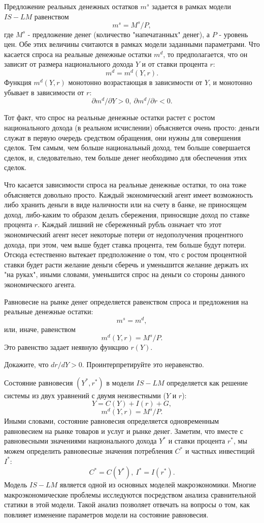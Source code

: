     Предложение реальных денежных остатков $m^{s}$ задается в рамках
    модели $IS-LM$ равенством
    \[m^{s}=M^{s}/P,\]
    где $M^{s}$ - предложение денег (количество "напечатанных" денег), а $P$ -
    уровень цен. Обе этих величины считаются в рамках модели заданными
    параметрами. Что касается спроса на реальные денежные остатки $m^{d}$, то
    предполагается, что он зависит от размера национального дохода $Y$  и
    от ставки процента $r$:
    \[m^{d}=m^{d}(Y,r).\]
    Функция $m^{d}(Y,r)$ монотонно возрастающая в зависимости от $Y$, и
    монотонно убывает в зависимости от $r$:
    \[\partial m^{d}/\partial Y>0, \ \partial m^{d}/\partial r<0.\]

    Тот факт, что спрос на реальные денежные остатки растет с ростом
    национального дохода (в реальном исчислении) объясняется очень
    просто: деньги служат в первую очередь средством обращения, они
    нужны для совершения сделок. Тем самым, чем больше национальный
    доход, тем больше совершается сделок, и, следовательно, тем больше
    денег необходимо для обеспечения этих сделок.

    Что касается зависимости спроса на реальные денежные остатки, то
    она тоже объясняется довольно просто. Каждый экономический агент
    имеет возможность либо хранить деньги в виде наличности или на счету
    в банке, не приносящем доход, либо-каким то образом делать
    сбережения, приносящие доход по ставке процента $r$. Каждый лишний
    не сбереженный рубль означает что этот экономический агент несет некоторые
    потери от недополучения процентного дохода, при этом, чем выше будет
    ставка процента, тем больше будут потери. Отсюда естественно вытекает
    предположение о том, что с ростом процентной ставки будет расти желание
    деньги сберечь и уменьшится желание держать их "на руках", иными
    словами, уменьшится спрос на деньги со стороны данного экономического агента.

    Равновесие на рынке денег определяется равенством спроса и предложения
    на реальные денежные остатки:
    \[m^{s}=m^{d},\]
    или, иначе, равенством
    \[m^{d}(Y,r)= M^{s}/P.\]
    Это равенство задает неявную функцию $r(Y)$.

\begin{exer}
    Докажите, что $dr/dY>0$. Проинтерпретируйте это неравенство.
\end{exer}

    Состояние равновесия $(Y^{*},r^{*})$ в модели $IS-LM$ определяется как решение
    системы из двух уравнений с двумя неизвестными ($Y$ и $r$):
    \[Y=C(Y)+I(r)+G,\]
    \[m^{d}(Y,r)= M^{s}/P.\]
    Иными словами, состояние равновесия определяется одновременным
    равновесием на рынке товаров и услуг и рынке денег. Заметим, что
    вместе с равновесными значениями национального дохода $Y^{*}$ и ставки
    процента $r^{*}$, мы можем определить равновесные значения потребления
    $C^{*}$ и частных инвестиций $I^{*}$:
    \[C^{*}=C(Y^{*}), \ I^{*}=I(r^{*}).\]
    Модель $IS-LM$ является одной из основных моделей макроэкономики.
    Многие макроэкономические проблемы исследуются посредством анализа
    сравнительной статики в этой модели. Такой анализ позволяет отвечать
    на вопросы о том,  как повлияет изменение параметров модели на состояние равновесия.


